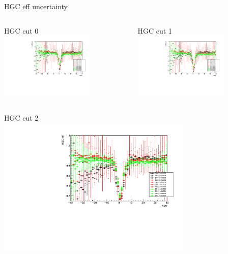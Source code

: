 \documentclass[aspectratio=169,xcolor=dvipsnames]{beamer}
\begin{document}
\begin{frame}{HGC eff uncertainty}
    \begin{columns}
    \begin{column}[T]{0.5\textwidth}
    HGC cut 0 \\
    \includegraphics[width = 0.7\textwidth]{results/pid/hgcer/x_Q2_0.35_4.00_0_xcer.pdf}
    \end{column}
     \begin{column}[T]{0.5\textwidth}
     HGC cut 1 \\
     \includegraphics[width = 0.7\textwidth]{results/pid/hgcer/x_Q2_0.35_4.00_1_xcer.pdf}
    \end{column}
    \end{columns}
     \begin{columns}
    \begin{column}[T]{0.5\textwidth}
    HGC cut 2 \\
    \includegraphics[width = 0.7\textwidth]{results/pid/hgcer/x_Q2_0.35_4.00_2_xcer.pdf}

\end{column}
\end{columns}
\end{frame}
\end{document}
